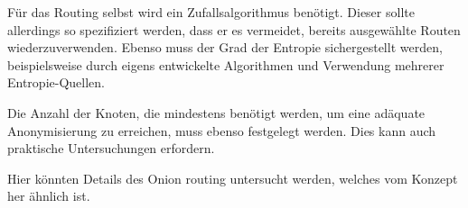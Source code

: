 Für das Routing selbst wird ein Zufallsalgorithmus benötigt. Dieser sollte allerdings so spezifiziert werden, dass er es vermeidet, bereits ausgewählte Routen wiederzuverwenden. Ebenso muss der Grad der Entropie sichergestellt werden, beispielsweise durch eigens entwickelte Algorithmen und Verwendung mehrerer Entropie-Quellen.

Die Anzahl der Knoten, die mindestens benötigt werden, um eine adäquate Anonymisierung zu erreichen, muss ebenso festgelegt werden. Dies kann auch praktische Untersuchungen erfordern.

Hier könnten Details des Onion routing     untersucht werden, welches vom Konzept her ähnlich ist.